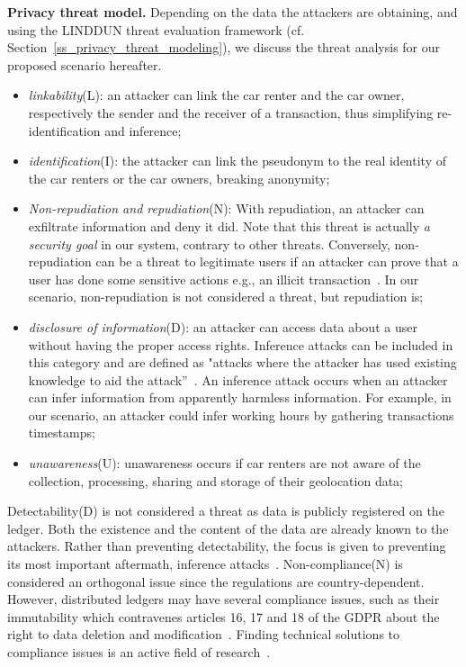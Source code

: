 \textbf{Privacy threat model.}
Depending on the data the attackers are obtaining, and using the LINDDUN threat evaluation framework \cite{Wuyts2015} (cf. Section \ref{ss_privacy_threat_modeling}), we discuss the threat analysis for our proposed scenario hereafter. 
\begin{itemize}
    \item \emph{linkability}(L): an attacker can link the car renter and the car owner, respectively the sender and the receiver of a transaction, thus simplifying re-identification and inference; 
    \item \emph{identification}(I): the attacker can link 
    the pseudonym to the real identity of the car renters or the car owners, breaking anonymity;
    \item \emph{Non-repudiation and repudiation}(N): With repudiation, an attacker can exfiltrate information and deny it did. Note that this threat is actually \emph{a security goal} in our system, contrary to other threats. Conversely, non-repudiation can be a threat to legitimate users if an attacker can prove that a user has done some sensitive actions e.g., an illicit transaction~\cite{Wuyts2015}. In our scenario, non-repudiation is not considered a threat, but repudiation is;
    \item \emph{disclosure of information}(D): an attacker can access data about a user without having the proper access rights. Inference attacks can be included in this category and are defined as "attacks where the attacker has used existing knowledge to aid the attack”~\cite{Henriksen2016}. An inference attack occurs when an attacker can infer information from apparently harmless information. For example, in our scenario, an attacker could infer working hours by gathering transactions timestamps;
    \item \emph{unawareness}(U): unawareness occurs if car renters are not aware of the collection, processing, sharing and storage of their geolocation data;
\end{itemize}

Detectability(D) is not considered a threat as data is publicly registered on the ledger. Both the existence and the content of the data are already known to the attackers. Rather than preventing detectability, the focus is given to preventing its most important aftermath, inference attacks~\cite{Wuyts2015}.
Non-compliance(N) is considered an orthogonal issue since the regulations are country-dependent. However, distributed ledgers may have several compliance issues, such as their immutability which contravenes articles 16, 17 and 18 of the GDPR about the right to data deletion and modification~\cite{EUdataregulations2018}. Finding technical solutions to compliance issues is an active field of research~\cite{Haque2021}.

